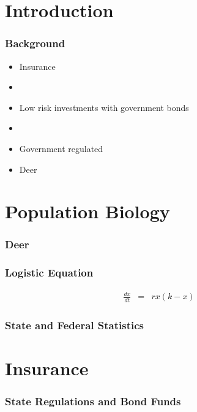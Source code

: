 


\section{Introduction}

\begin{frame}
    \frametitle{Background}
	\begin{itemize}
		\item Insurance
			\item\item Low risk investments with government bonds
			\item\item Government regulated
		\item Deer
	\end{itemize}

\end{frame}







\section{Population Biology}

\begin{frame}
    \frametitle{Deer}
\end{frame}

\begin{frame}
    \frametitle{Logistic Equation}
	\begin{eqnarray}
		\frac{dx}{dt} &=& rx(k-x)
	\end{eqnarray}
\end{frame}

\begin{frame}
    \frametitle{State and Federal Statistics}
\end{frame}






\section{Insurance}

\begin{frame}
    \frametitle{State Regulations and Bond Funds}
\end{frame}



